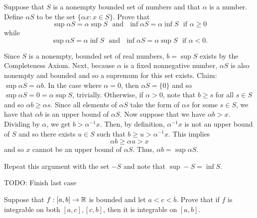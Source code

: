 \documentclass[letterpaper, twoside, 12pt]{book}
\begin{document}
\begin{exercise}[4]
  Suppose that \(S\) is a nonempty bounded set of numbers and that \(\alpha\)
  is a number. Define \(\alpha S\) to be the set \(\{\alpha x:x\in S\}\).
  Prove that
  \[
    \sup\alpha S=\alpha\sup S
      \text{~~and~~}
    \inf\alpha S=\alpha\inf S
      \text{~~if~}
    \alpha\geq 0
  \]
  while
  \[
    \sup\alpha S=\alpha\inf S
      \text{~~and~~}
    \inf\alpha S=\alpha\sup S
      \text{~~if~}
    \alpha< 0
  .\]
\end{exercise}

\begin{solution}
    Since \(S\) is a nonempty, bounded set of real numbers, \(b = \sup S\)
    exists by the Completeness Axiom. Next, because \(\alpha\) is a fixed nonnegative
    number, \(\alpha S\) is also nonempty and bounded and so a supremum for this
    set exists. Claim: \( \sup \alpha S = \alpha b \). In the case where \(\alpha = 0\),
    then \(\alpha S = \{0\}\) and so \(\sup \alpha S = 0 = \alpha \sup S\),
    trivially. Otherwise, if \(\alpha > 0\), note that \(b \geq s \) for all \(s \in S\)
    and so \(\alpha b \geq \alpha s\). Since all elements of \(\alpha S\) take the 
    form of \(\alpha s\) for some \(s \in S\), we have that \(\alpha b\) is an upper 
    bound of \(\alpha S\). Now suppose that we have \(\alpha b > x\). 
    Dividing by \(\alpha\), we get \(b > \alpha^{-1} x \). Then, by definition,
    \(\alpha^{-1} x\) is not an upper bound of \(S\) and so there exists \(u \in S\)
    such that \(b \geq u > \alpha^{-1} x\). This implies
    \[ \alpha b \geq \alpha u > x \]
    and so \(x\) cannot be an upper bound of \(\alpha S\). Thus, \(\alpha b = \sup \alpha S\).

   
    Repeat this argument with the set \(-S\) and note that \(\sup -S = \inf S\). 


    TODO: Finish last case 

\end{solution}


\begin{exercise}[6]
  Suppose that \(f:[a,b]\to\mathbb R\) is bounded and let \(a<c<b\). Prove that if
  \(f\) is integrable on both \([a,c],[c,b]\), then it is integrable on
  \([a,b]\).
\end{exercise}
\end{document}
